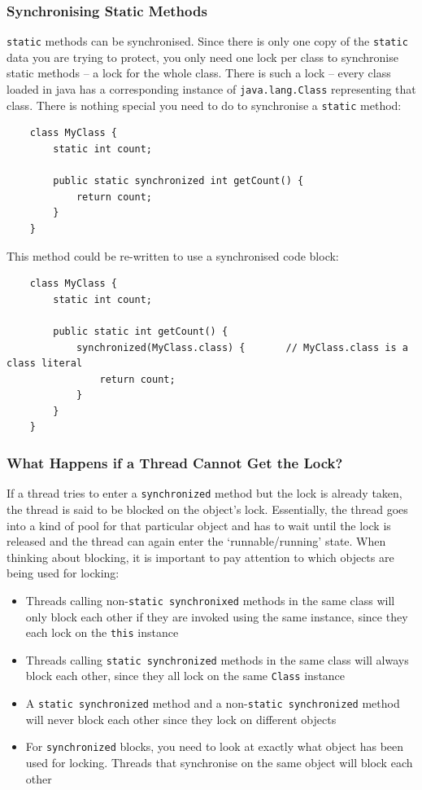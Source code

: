 \subsubsection{Synchronising Static Methods}
\verb#static# methods can be synchronised. Since there is only one copy of the 
\verb#static# data you are trying to protect, you only need one lock per class 
to synchronise static methods -- a lock for the whole class. There is such a 
lock -- every class loaded in java has a corresponding instance of 
\verb#java.lang.Class# representing that class. There is nothing special you 
need to do to synchronise a \verb#static# method:
\begin{verbatim}
    class MyClass {
        static int count;

        public static synchronized int getCount() {
            return count;
        }
    }
\end{verbatim}
This method could be re-written to use a synchronised code block:
\begin{verbatim}
    class MyClass {
        static int count;

        public static int getCount() {
            synchronized(MyClass.class) {       // MyClass.class is a class literal
                return count;
            }
        }
    }
\end{verbatim}

\subsubsection{What Happens if a Thread Cannot Get the Lock?}
If a thread tries to enter a \verb#synchronized# method but the lock is already 
taken, the thread is said to be blocked on the object's lock. Essentially, the 
thread goes into a kind of pool for that particular object and has to wait 
until the lock is released and the thread can again enter the 
`runnable/running' state.  When thinking about blocking, it is important to pay 
attention to which objects are being used for locking:
\begin{itemize}
    \item Threads calling non-\verb#static synchronixed# methods in the same 
    class will only block each other if they are invoked using the same 
    instance, since they each lock on the \verb#this# instance
    \item Threads calling \verb#static synchronized# methods in the same class 
    will always block each other, since they all lock on the same \verb#Class# 
    instance
    \item A \verb#static synchronized# method and a non-\verb#static synchronized# method will never block each other since they lock on 
    different objects
    \item For \verb#synchronized# blocks, you need to look at exactly what 
    object has been used for locking. Threads that synchronise on the same 
    object will block each other
\end{itemize}


